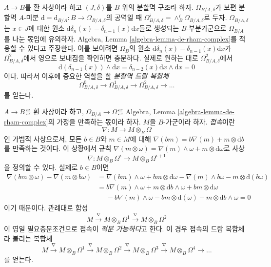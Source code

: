 \begin{remark}
\label{remark-divided-powers-de-rham-complex}
$A \to B$를 환 사상이라 하고 $(J, \delta)$를 $B$ 위의 분할멱
구조라 하자. $\Omega_{B/A, \delta}$가 보편 분할멱 $A$-미분
$\text{d} = \text{d}_{B/A} : B \to \Omega_{B/A, \delta}$의
공역일 때
$\Omega_{B/A, \delta}^i = \wedge^i_B \Omega_{B/A, \delta}$로 두자.
$\Omega_{B/A, \delta}$는 $x \in J$에 대한 원소
$\text{d}\delta_n(x) - \delta_{n - 1}(x)\text{d}x$들로 생성되는
$B$-부분가군으로 $\Omega_{B/A}$를 나눈 몫임에 유의하자.
Algebra, Lemma \ref{algebra-lemma-de-rham-complex}를 적용할 수 있다고
주장한다. 이를 보이려면 $\Omega_B$의 원소
$\text{d}\delta_n(x) - \delta_{n - 1}(x)\text{d}x$가
$\Omega^2_{B/A, \delta}$에서 영으로 보내짐을 확인하면 충분하다.
실제로 원하는 대로 $\Omega^2_{B/A, \delta}$에서
$$
\text{d}(\delta_{n - 1}(x)) \wedge \text{d}x
= \delta_{n - 2}(x) \text{d}x \wedge \text{d}x = 0
$$
이다. 따라서 이후에 중요한 역할을 할 {\it 분할멱 드람 복합체}
$$
\Omega^0_{B/A, \delta} \to \Omega^1_{B/A, \delta} \to
\Omega^2_{B/A, \delta} \to \ldots
$$
를 얻는다.
\end{remark}

\begin{remark}
\label{remark-connection}
$A \to B$를 환 사상이라 하고, $\Omega_{B/A} \to \Omega$를
Algebra, Lemma \ref{algebra-lemma-de-rham-complex}의 가정을 만족하는
몫이라 하자. $M$을 $B$-가군이라 하자. {\it 접속}이란
$$
\nabla : M \longrightarrow M \otimes_B \Omega
$$
인 가법적 사상으로서, 모든 $b \in B$와 $m \in M$에 대해
$\nabla(bm) = b \nabla(m) + m \otimes \text{d}b$를 만족하는 것이다.
이 상황에서 규칙 $\nabla(m \otimes \omega) = \nabla(m) \wedge \omega +
m \otimes \text{d}\omega$로 사상
$$
\nabla : M \otimes_B \Omega^i \longrightarrow M \otimes_B \Omega^{i + 1}
$$
을 정의할 수 있다. 실제로 $b \in B$이면
\begin{align*}
\nabla(bm \otimes \omega) - \nabla(m \otimes b\omega)
& =
\nabla(bm) \wedge \omega + bm \otimes \text{d}\omega
- \nabla(m) \wedge b\omega - m \otimes \text{d}(b\omega) \\
& =
b\nabla(m) \wedge \omega + m \otimes \text{d}b \wedge \omega
+ bm \otimes \text{d}\omega \\
& \ \ \ \ \ \ - b\nabla(m) \wedge \omega - bm \otimes \text{d}(\omega)
- m \otimes \text{d}b \wedge \omega = 0
\end{align*}
이기 때문이다. 관례대로 합성
$$
M \xrightarrow{\nabla} M \otimes_B \Omega^1
\xrightarrow{\nabla} M \otimes_B \Omega^2
$$
이 영일 필요충분조건으로 접속이 {\it 적분 가능하다}고 한다.
이 경우 접속의 드람 복합체라 불리는 복합체
$$
M \xrightarrow{\nabla} M \otimes_B \Omega^1
\xrightarrow{\nabla} M \otimes_B \Omega^2
\xrightarrow{\nabla} M \otimes_B \Omega^3
\xrightarrow{\nabla} M \otimes_B \Omega^4 \to \ldots
$$
를 얻는다.
\end{remark}

